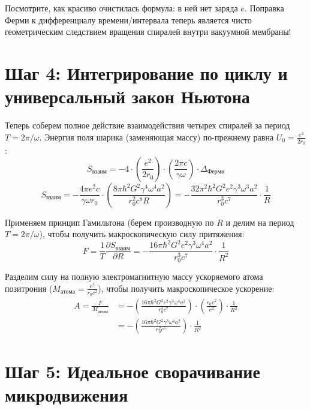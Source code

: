\documentclass[12pt,a4paper]{article}
\begin{document}
Посмотрите, как красиво очистилась формула: в ней нет заряда $e$. Поправка Ферми к дифференциалу времени/интервала теперь является чисто геометрическим следствием вращения спиралей внутри вакуумной мембраны!

\section*{Шаг 4: Интегрирование по циклу и универсальный закон Ньютона}

Теперь соберем полное действие взаимодействия четырех спиралей за период $T = 2\pi/\omega$. Энергия поля шарика (заменяющая массу) по-прежнему равна $U_0 = \frac{e^2}{2r_0}$:
\begin{equation}
S_{взаим} = - 4 \cdot \left(\frac{e^2}{2r_0}\right) \cdot \left(\frac{2\pi c}{\gamma \omega}\right) \cdot \Delta_{Ферми}
\end{equation}
\begin{equation}
S_{взаим} = - \frac{4\pi e^2 c}{\gamma \omega r_0} \cdot \left( \frac{8\pi \hbar^2 G^2 \gamma^4 \omega^4 a^2}{r_0^2 c^8 R} \right) = - \frac{32 \pi^2 \hbar^2 G^2 e^2 \gamma^3 \omega^3 a^2}{r_0^3 c^7} \cdot \frac{1}{R}
\end{equation}

Применяем принцип Гамильтона (берем производную по $R$ и делим на период $T = 2\pi/\omega$), чтобы получить макроскопическую силу притяжения:
\begin{equation}
F = \frac{1}{T} \frac{\partial S_{взаим}}{\partial R} = - \frac{16\pi \hbar^2 G^2 e^2 \gamma^3 \omega^4 a^2}{r_0^3 c^7} \cdot \frac{1}{R^2}
\end{equation}

Разделим силу на полную электромагнитную массу ускоряемого атома позитрония ($M_{атома} = \frac{e^2}{r_0 c^2}$), чтобы получить макроскопическое ускорение:
\begin{align}
A = \frac{F}{M_{атома}} &= - \left( \frac{16\pi \hbar^2 G^2 e^2 \gamma^3 \omega^4 a^2}{r_0^3 c^7} \right) \cdot \left( \frac{r_0 c^2}{e^2} \right) \cdot \frac{1}{R^2} \\
&= - \left( \frac{16\pi \hbar^2 G^2 \gamma^3 \omega^4 a^2}{r_0^2 c^5} \right) \cdot \frac{1}{R^2}
\end{align}

\section*{Шаг 5: Идеальное сворачивание микродвижения}
\end{document}
